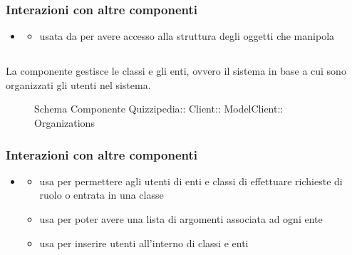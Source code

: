 \subsubsection{Interazioni con altre componenti}
\begin{itemize}
\item {}
\begin{itemize}
\item usata da  per avere accesso alla struttura degli oggetti che manipola
\end{itemize}
\end{itemize}
\subsection{}
La componente gestisce le classi e gli enti, ovvero il sistema in base a cui sono organizzati gli utenti nel sistema.
\begin{figure}[H]
\centering
\noindent{}
\caption[Schema Componente Organizations]{Schema Componente Quizzipedia:: Client:: ModelClient:: Organizations}
\end{figure}
\subsubsection{Interazioni con altre componenti}
\begin{itemize}
\item {}
\begin{itemize}
\item usa  per permettere agli utenti di enti e classi di effettuare richieste di ruolo o entrata in una classe
\item usa  per poter avere una lista di argomenti associata ad ogni ente
\item usa  per inserire utenti all'interno di classi e enti
\end{itemize}
\end{itemize}
